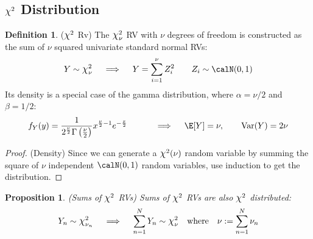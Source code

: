 \documentclass[12pt]{article}
\theoremstyle{plain}
\newtheorem{prop}[thm]{Proposition}
\theoremstyle{definition}
\newtheorem{defn}[thm]{Definition}
\theoremstyle{remark}
\newcommand*{\Chi}{\mbox{\large$\chi$}} %
\newcommand{\Var}{\operatorname{Var}}
\newcommand{\sumnN}{\sum^N_{n=1}}
\begin{document}
\clearpage
\subsection{$\Chi^2$ Distribution}


\begin{defn}($\Chi^2$ Rv)
The $\Chi^2_\nu$ RV with $\nu$ degrees of freedom is constructed as the
sum of $\nu$ squared univariate standard normal RVs:
\begin{align*}
  Y \sim \Chi^2_\nu
  \quad\implies\quad
	 Y = \sum^\nu_{i=1} Z^2_i
   \qquad Z_i \sim \calN(0,1)
\end{align*}
Its density is a special case of the gamma distribution, where
$\alpha = \nu/2$ and $\beta = 1/2$:
\begin{equation}
   f_Y(y) =
   \frac{1}{2^{\frac{\nu}{2}} \Gamma\left(\frac{\nu}{2}\right)}
    x^{\frac{\nu}{2} - 1} e^{-\frac{x}{2}} \qquad
   \quad\implies\quad
   \E[Y] = \nu, \qquad \Var(Y) = 2\nu
\end{equation}
\end{defn}
\begin{proof}(Density)
Since we can generate a $\Chi^2(\nu)$ random variable by summing the
square of $\nu$ independent $\calN(0,1)$ random variables, use induction
to get the distribution.
\end{proof}

\begin{prop}\emph{(Sums of $\Chi^2$ RVs)}
\label{prop:chisum}
Sums of $\Chi^2$ RVs are also $\Chi^2$ distributed:
\begin{align*}
  Y_n\sim\Chi_{\nu_n}^2
  \quad\implies\quad
  \sumnN Y_n \sim \Chi^2_{\nu}
  \quad
  \text{where}\quad
  \nu:=\sumnN \nu_n
\end{align*}
\end{prop}
\end{document}

